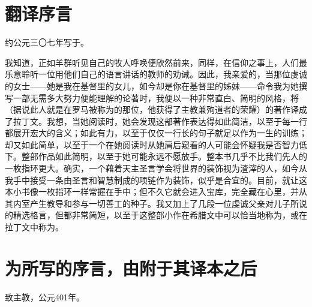 
\section{翻译序言}

约公元三〇七年写于。\par

\par

我知道，正如羊群听见自己的牧人呼唤便欣然前来，同样，在信仰之事上，人们最乐意聆听一位用他们自己的语言讲话的教师的劝诫。因此，我亲爱的，当那位虔诚的女士——她是我在基督里的女儿，如今却是你在基督里的姊妹——命令我为她撰写一部无需多大努力便能理解的论著时，我便以一种非常直白、简明的风格，将（据说此人就是在罗马被称为的那位，他获得了主教兼殉道者的荣耀）的著作译成了拉丁文。我想，当她阅读时，她会发现这部著作表达得如此简洁，以至于每一行都展开宏大的含义；如此有力，以至于仅仅一行长的句子就足以作为一生的训练；却又如此简单，以至于一个在她阅读时从她肩后窥看的人可能会怀疑我是否智力低下。整部作品如此简明，以至于她可能永远不愿放手。整本书几乎不比我们先人的一枚指环更大。确实，一个藉着天主圣言学会将世界的装饰视为渣滓的人，如今从我手中接受一条由圣言和智慧制成的项链作为装饰，似乎是合宜的。目前，就让这本小书像一枚指环一样常握在手中；但不久它就会进入宝库，完全藏在心里，并从其内室产生教导和参与一切善工的种子。我又加上了几段一位虔诚父亲对儿子所说的精选格言，但都非常简短，以至于这整部小作在希腊文中可以恰当地称为，或在拉丁文中称为。\par


\section{为所写的序言，由附于其译本之后}

致主教，公元401年。\par

\par

